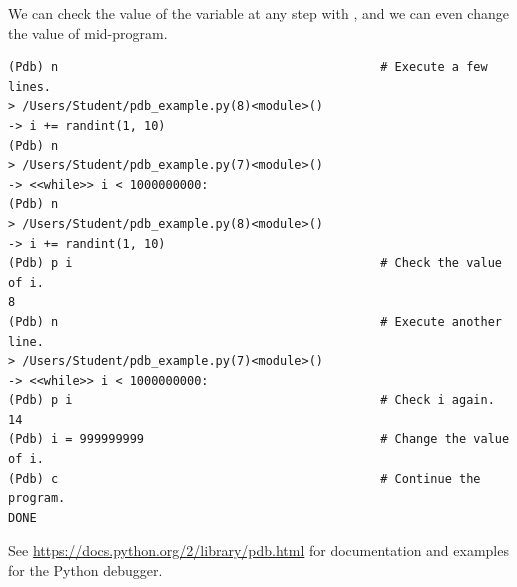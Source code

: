 We can check the value of the variable  at any step with , and we can even change the value of  mid-program.

\begin{lstlisting}
(Pdb) n                                             # Execute a few lines.
> /Users/Student/pdb_example.py(8)<module>()
-> i += randint(1, 10)
(Pdb) n
> /Users/Student/pdb_example.py(7)<module>()
-> <<while>> i < 1000000000:
(Pdb) n
> /Users/Student/pdb_example.py(8)<module>()
-> i += randint(1, 10)
(Pdb) p i                                           # Check the value of i.
8
(Pdb) n                                             # Execute another line.
> /Users/Student/pdb_example.py(7)<module>()
-> <<while>> i < 1000000000:
(Pdb) p i                                           # Check i again.
14
(Pdb) i = 999999999                                 # Change the value of i.
(Pdb) c                                             # Continue the program.
DONE
\end{lstlisting}

See \url{https://docs.python.org/2/library/pdb.html} for documentation and examples for the Python debugger.

